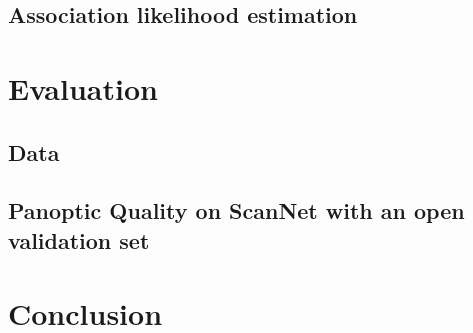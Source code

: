 \documentclass[runningheads]{llncs}
\begin{document}
    \subsection{Association likelihood estimation}
        \label{subsec:likelihood}
        

\section{Evaluation}
    \label{sec:evaluation}
    
     
    \subsection{Data}
        \label{subsec:data}
        
        
    \subsection{Panoptic Quality on ScanNet with an open validation set}
        \label{subsec:scannet_open_test}
        

\section{Conclusion}
    \label{sec:conclusion}
    
    


\end{document}
